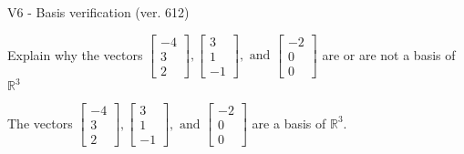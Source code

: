 \begin{exercise}
  \begin{exerciseTitle}V6 - Basis verification (ver. 612)\end{exerciseTitle}
  \begin{exerciseStatement}
    Explain why the vectors \(\left[\begin{array}{r}
-4 \\
3 \\
2
\end{array}\right] , \left[\begin{array}{r}
3 \\
1 \\
-1
\end{array}\right] , \text{ and } \left[\begin{array}{r}
-2 \\
0 \\
0
\end{array}\right]\) are or are not a basis of \(\mathbb{R}^3\)	


  \end{exerciseStatement}
  \begin{exerciseAnswer}
   The vectors \(\left[\begin{array}{r}
-4 \\
3 \\
2
\end{array}\right] , \left[\begin{array}{r}
3 \\
1 \\
-1
\end{array}\right] , \text{ and } \left[\begin{array}{r}
-2 \\
0 \\
0
\end{array}\right]\) 
  	 are  a basis of \(\mathbb{R}^3\).
  


  \end{exerciseAnswer}
\end{exercise}